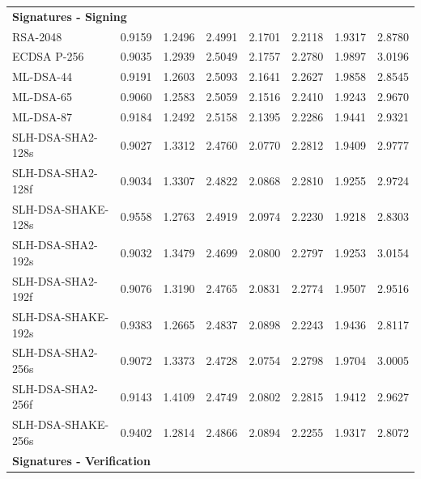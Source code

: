 \documentclass[11pt, letterpaper]{article}
\begin{document}
\begin{table}[H]
\begin{longtable}{lccccccc}
\hline
\multicolumn{8}{l}{\textbf{Signatures - Signing}} \\

RSA-2048 & 0.9159 & 1.2496 & 2.4991 & 2.1701 & 2.2118 & 1.9317 & 2.8780 \\
ECDSA P-256 & 0.9035 & 1.2939 & 2.5049 & 2.1757 & 2.2780 & 1.9897 & 3.0196 \\
ML-DSA-44 & 0.9191 & 1.2603 & 2.5093 & 2.1641 & 2.2627 & 1.9858 & 2.8545 \\
ML-DSA-65 & 0.9060 & 1.2583 & 2.5059 & 2.1516 & 2.2410 & 1.9243 & 2.9670 \\
ML-DSA-87 & 0.9184 & 1.2492 & 2.5158 & 2.1395 & 2.2286 & 1.9441 & 2.9321 \\
SLH-DSA-SHA2-128s & 0.9027 & 1.3312 & 2.4760 & 2.0770 & 2.2812 & 1.9409 & 2.9777 \\
SLH-DSA-SHA2-128f & 0.9034 & 1.3307 & 2.4822 & 2.0868 & 2.2810 & 1.9255 & 2.9724 \\
SLH-DSA-SHAKE-128s & 0.9558 & 1.2763 & 2.4919 & 2.0974 & 2.2230 & 1.9218 & 2.8303 \\
SLH-DSA-SHA2-192s & 0.9032 & 1.3479 & 2.4699 & 2.0800 & 2.2797 & 1.9253 & 3.0154 \\
SLH-DSA-SHA2-192f & 0.9076 & 1.3190 & 2.4765 & 2.0831 & 2.2774 & 1.9507 & 2.9516 \\
SLH-DSA-SHAKE-192s & 0.9383 & 1.2665 & 2.4837 & 2.0898 & 2.2243 & 1.9436 & 2.8117 \\
SLH-DSA-SHA2-256s & 0.9072 & 1.3373 & 2.4728 & 2.0754 & 2.2798 & 1.9704 & 3.0005 \\
SLH-DSA-SHA2-256f & 0.9143 & 1.4109 & 2.4749 & 2.0802 & 2.2815 & 1.9412 & 2.9627 \\
SLH-DSA-SHAKE-256s & 0.9402 & 1.2814 & 2.4866 & 2.0894 & 2.2255 & 1.9317 & 2.8072 \\

\hline
\multicolumn{8}{l}{\textbf{Signatures - Verification}} \\


\end{longtable}
\end{table}
\end{document}
